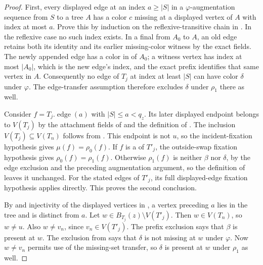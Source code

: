 \begin{proof}
First, every displayed edge at an index \(a\ge |S|\) in a
\(\varphi\)-augmentation sequence from \(S\) to a tree \(A\) has a color
\(c\) missing at a displayed vertex of \(A\) with index at most \(a\).
Prove this by induction on the reflexive-transitive chain in
.  In the reflexive case no such
index exists.  In a final  from \(A_0\)
to \(A\), an old edge retains both its identity and its earlier
missing-color witness by the exact
 fields.  The newly appended
edge has a color in  of \(A_0\); a witness
vertex has index at most \(|A_0|\), which is the new edge's index, and
the exact prefix identifies that same vertex in \(A\).
Consequently no edge of \(T_j\) at index at least \(|S|\) can have
color \(\delta\) under \(\varphi\).  The edge-transfer assumption
therefore excludes \(\delta\) under \(\rho_1\) there as well.

Consider \(f=T_j.\operatorname{edge}(a)\) with \(|S|\le a<q_z\).
Its later displayed endpoint belongs to \(V(T_j)\) by the attachment
fields of  and the definition of
.  The inclusion
\(V(T_j)\subseteq V(T_n)\) follows from
.
This endpoint is not \(u\), so the incident-fixation hypothesis gives
\(\mu(f)=\rho_0(f)\).  If \(f\) is a
 of \(T'_j\), the
outside-swap fixation hypothesis gives \(\rho_0(f)=\rho_1(f)\).
Otherwise \(\rho_1(f)\) is neither \(\beta\) nor \(\delta\), by the
edge exclusion and the preceding augmentation argument, so the
definition of  leaves it unchanged.
For the stated edges of \(T'_j\), its full displayed-edge fixation
hypothesis applies directly.  This proves the second conclusion.

By  and injectivity of the displayed
vertices in , a vertex preceding \(a\) lies in
the tree and is distinct from \(a\).
Let \(w\in B_{T_j}(z)\setminus V(T'_j)\).
Then \(w\in V(T_n)\), so \(w\ne u\).
Also \(w\ne v_n\), since \(v_n\in V(T'_j)\).
The prefix exclusion says that \(\beta\) is present at \(w\).
The exclusion from  says that \(\delta\)
is not missing at \(w\) under \(\varphi\).
Now \(w\ne v_n\) permits use of the missing-set transfer, so \(\delta\)
is present at \(w\) under \(\rho_1\) as well.


\end{proof}
